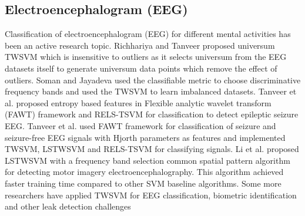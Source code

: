 \documentclass[pdflatex,sn-mathphys]{sn-jnl}%
\theoremstyle{thmstyleone}%
\theoremstyle{thmstyletwo}%
\theoremstyle{thmstylethree}%
\begin{document}
\subsection{Electroencephalogram (EEG)}
Classification of electroencephalogram (EEG) for different mental activities has been an active research topic. Richhariya and Tanveer \cite{richhariya2018eeg} proposed universum TWSVM which is insensitive to outliers as it selects universum from the EEG datasets itself to generate universum data points which remove the effect of outliers. Soman and Jayadeva \cite{soman2015high} used the classifiable metric to choose discriminative frequency bands and used the TWSVM to learn imbalanced datasets. Tanveer et al. \cite{tanveer2018entropy} proposed entropy based features in Flexible analytic wavelet transform (FAWT) framework and RELS-TSVM \cite{tanveer2016robust}  for classification to detect epileptic seizure EEG. Tanveer et al.  \cite{tanveer2018classification} used FAWT framework for classification of seizure and seizure-free EEG signals with Hjorth parameters as features and implemented TWSVM, LSTWSVM and RELS-TSVM \cite{tanveer2016robust} for classifying signals. Li et al. \cite{li2018self} proposed LSTWSVM with a frequency band selection common spatial pattern algorithm for detecting motor imagery electroencephalography. This algorithm achieved faster training time compared to other SVM baseline algorithms.
Some more researchers have applied TWSVM for EEG classification, biometric identification and other leak detection challenges \cite{kumar2021universum,gupta2021data,she2015multiclass,li2018self,kostilek2012eeg,lang2017leak,dalal2019automated}
\end{document}
